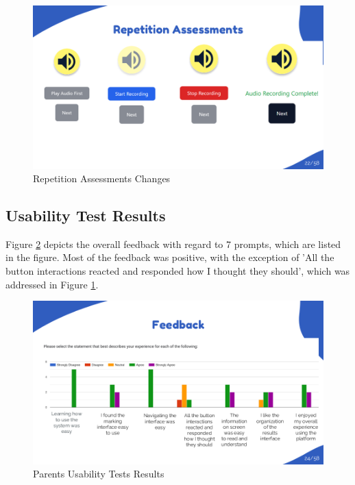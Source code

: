 \documentclass{article}
\begin{document}
\begin{figure}[H]
  \centering
  \includegraphics[width=\textwidth]{images/slide22.png}
  \caption{Repetition Assessments Changes}
  \label{fig:rep_changes}
\end{figure}

\newpage

\subsection{Usability Test Results}

\hspace{2em} Figure \ref{fig:parents_feedback} depicts the overall feedback with regard to 7 prompts, which are listed in the figure.
Most of the feedback was positive, with the exception of 'All the button interactions reacted and responded how I thought they should', which was addressed in Figure \ref{fig:rep_changes}.

\begin{figure}[H]
  \centering
  \includegraphics[width=\textwidth]{images/slide24.png}
  \caption{Parents Usability Tests Results}
  \label{fig:parents_feedback}
\end{figure}
\end{document}
